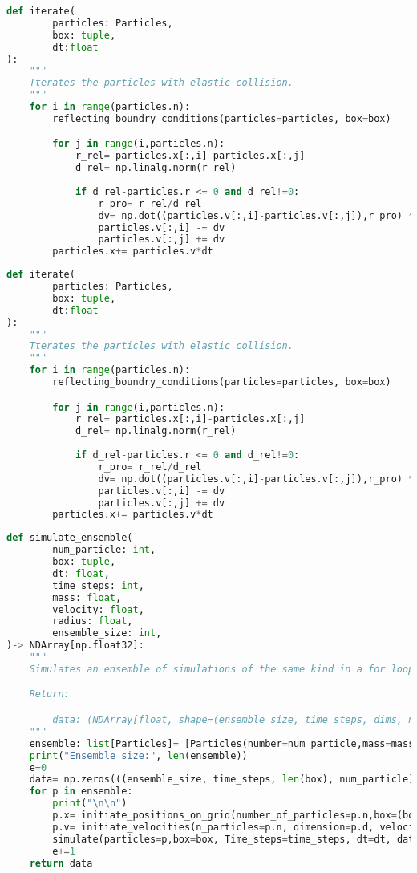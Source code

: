 \documentclass{article}[a4paper]
\begin{document}
\begin{lstlisting}[language=python]
def iterate(
        particles: Particles,
        box: tuple,
        dt:float
):
    """
    Tterates the particles with elastic collision.
    """
    for i in range(particles.n):
        reflecting_boundry_conditions(particles=particles, box=box) 

        for j in range(i,particles.n):
            r_rel= particles.x[:,i]-particles.x[:,j]
            d_rel= np.linalg.norm(r_rel)
            
            if d_rel-particles.r <= 0 and d_rel!=0:
                r_pro= r_rel/d_rel
                dv= np.dot((particles.v[:,i]-particles.v[:,j]),r_pro) * r_pro
                particles.v[:,i] -= dv
                particles.v[:,j] += dv
        particles.x+= particles.v*dt  
\end{lstlisting}

\begin{lstlisting}[language=python]
    def iterate(
        particles: Particles,
        box: tuple,
        dt:float
):
    """
    Tterates the particles with elastic collision.
    """
    for i in range(particles.n):
        reflecting_boundry_conditions(particles=particles, box=box) 

        for j in range(i,particles.n):
            r_rel= particles.x[:,i]-particles.x[:,j]
            d_rel= np.linalg.norm(r_rel)
            
            if d_rel-particles.r <= 0 and d_rel!=0:
                r_pro= r_rel/d_rel
                dv= np.dot((particles.v[:,i]-particles.v[:,j]),r_pro) * r_pro
                particles.v[:,i] -= dv
                particles.v[:,j] += dv
        particles.x+= particles.v*dt  
\end{lstlisting}


\begin{lstlisting}[language=python]
def simulate_ensemble(
        num_particle: int,
        box: tuple,
        dt: float,
        time_steps: int,
        mass: float,
        velocity: float,
        radius: float,
        ensemble_size: int,
)-> NDArray[np.float32]:
    """
    Simulates an ensemble of simulations of the same kind in a for loop.

    Return: 

        data: (NDArray[float, shape=(ensemble_size, time_steps, dims, num_particle)])
    """
    ensemble: list[Particles]= [Particles(number=num_particle,mass=mass,radius=radius,dimensions=len(box)) for i in range(ensemble_size)]   
    print("Ensemble size:", len(ensemble))
    e=0
    data= np.zeros(((ensemble_size, time_steps, len(box), num_particle)))
    for p in ensemble:
        print("\n\n")
        p.x= initiate_positions_on_grid(number_of_particles=p.n,box=(box[0]/2,box[1]))
        p.v= initiate_velocities(n_particles=p.n, dimension=p.d, velocity=velocity)
        simulate(particles=p,box=box, Time_steps=time_steps, dt=dt, data=data[e])
        e+=1
    return data
\end{lstlisting}
\end{document}
